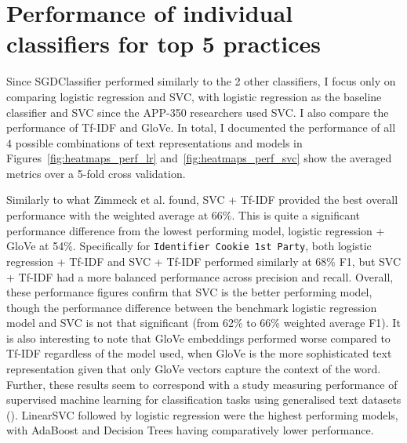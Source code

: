 \section{Performance of individual classifiers for top 5 practices}
Since SGDClassifier performed similarly to the 2 other classifiers, I focus only on comparing logistic regression and SVC, with logistic regression as the baseline classifier and SVC since the APP-350 researchers used SVC. I also compare the performance of Tf-IDF and GloVe. In total, I documented the performance of all 4 possible combinations of text representations and models in Figures~\ref{fig:heatmaps_perf_lr} and~\ref{fig:heatmaps_perf_svc} show the averaged metrics over a 5-fold cross validation. 

Similarly to what Zimmeck et al. found, SVC + Tf-IDF provided the best overall performance with the weighted average at 66\%. This is quite a significant performance difference from the lowest performing model, logistic regression + GloVe at 54\%. Specifically for \texttt{Identifier Cookie 1st Party}, both logistic regression + Tf-IDF and SVC + Tf-IDF performed similarly at 68\% F1, but SVC + Tf-IDF had a more balanced performance across precision and recall. Overall, these performance figures confirm that SVC is the better performing model, though the performance difference between the benchmark logistic regression model and SVC is not that significant (from 62\% to 66\% weighted average F1). It is also interesting to note that GloVe embeddings performed worse compared to Tf-IDF regardless of the model used, when GloVe is the more sophisticated text representation given that only GloVe vectors capture the context of the word. Further, these results seem to correspond with a study measuring performance of supervised machine learning for classification tasks using generalised text datasets (\cite{hsu2020}). LinearSVC followed by logistic regression were the highest performing models, with AdaBoost and Decision Trees having comparatively lower performance.

